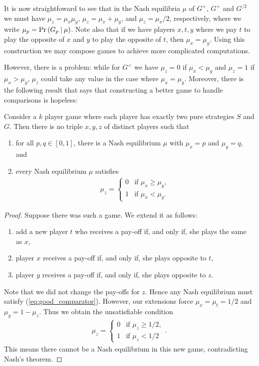 \documentclass{article}
\begin{document}
It is now straightfoward to see that in the Nash
equilibria $\mu$ of $G^\times$, $G^+$ and $G^{/2}$ we must have $\mu_z =
\mu_x\mu_y$, $\mu_z = \mu_x + \mu_y$, and $\mu_z = \mu_x / 2$, respectively,
where we write $\mu_p = \Pr\left({{G_p}\:|\:\mu}\right)$. Note also that if we have
players $x,t,y$ where we pay $t$ to play the opposite of $x$ and
$y$ to play the opposite of $t$, then $\mu_x=\mu_y$. Using this
construction we may compose games to achieve more complicated
computations.

However, there is a problem: while for $G^<$ we have
$\mu_z = 0$ if $\mu_x<\mu_y$ and $\mu_z = 1$ if $\mu_x>\mu_y$,
$\mu_z$ could take any value in the case where $\mu_x=\mu_y$.
Moreover, there is the following result that says that constructing
a better game to handle comparisons is hopeless:

\begin{lemma}
  Consider a $k$ player game where each player has exactly
  two pure strategies $S$ and $G$. Then there is no triple $x,y,z$ of
  distinct players such that
  \begin{enumerate}
    \item for all $p,q\in[0,1]$, there is a Nash equilibrium
      $\mu$ with $\mu_x = p$ and $\mu_y = q$, and
    \item every Nash equilibrium $\mu$ satisfies
      \begin{align}\label{eq:good_comparator}
        \mu_z = \begin{cases}
          0 &\text{if }\mu_x \geq \mu_y, \\
          1 & \text{if }\mu_x < \mu_y.
        \end{cases}
      \end{align}
  \end{enumerate}
  \begin{proof}
    Suppose there was such a game. We extend it as follows:
    \begin{enumerate}
      \item add a new player $t$ who receives a pay-off if, and only if,
        she plays the same as $x$,
      \item player $x$ receives a pay-off if, and only if, she plays
        opposite to $t$,
      \item player $y$ receives a pay-off if, and only if, she plays
        opposite to $z$.
    \end{enumerate}
    Note that we did not change the pay-offs for $z$. Hence any
    Nash equilibrium must satisfy (\ref{eq:good_comparator}).
    However, our extensions force $\mu_x = \mu_t = 1/2$
    and $\mu_y = 1-\mu_z$. Thus we obtain the unsatisfiable condition
    \begin{align*}
      \mu_z = \begin{cases}
        0 & \text{if } \mu_z \geq 1/2,\\
        1 & \text{if } \mu_z < 1/2
      \end{cases}.
    \end{align*}
    This means there cannot be a Nash equilibrium in this new game,
    contradicting Nash's theorem.
  \end{proof}
\end{lemma}
\end{document}
